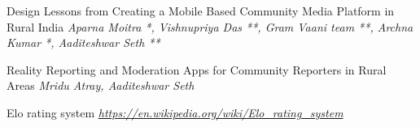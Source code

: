 \documentclass[11pt]{article}
\begin{document}
	\begin{thebibliography}{1}
	
    \bibitem{}
    Design Lessons from Creating a Mobile Based Community Media Platform in Rural India
    \textit{Aparna
Moitra *, Vishnupriya Das **, Gram Vaani team **, Archna Kumar *, Aaditeshwar Seth **}

    \bibitem{}
    Reality Reporting and Moderation Apps for Community Reporters in Rural Areas
    \textit{Mridu Atray, Aaditeshwar Seth}
    
    \bibitem{}
    Elo rating system
    \textit{\href{https://en.wikipedia.org/wiki/Elo_rating_system}{https://en.wikipedia.org/wiki/Elo_rating_system}}


	\end{thebibliography}
\end{document}
